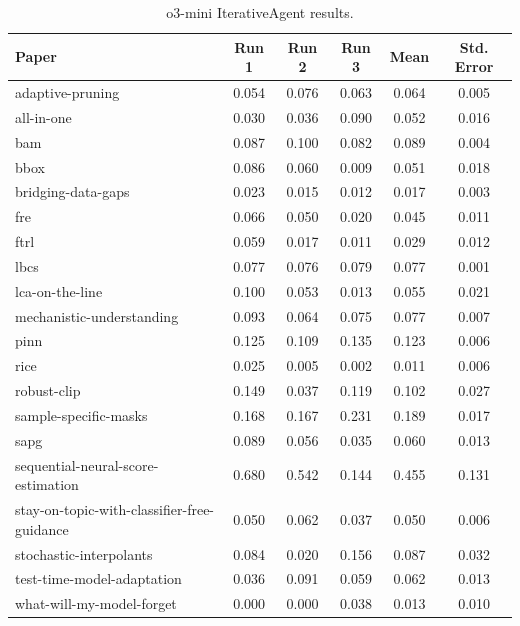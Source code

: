 \documentclass{article}
\theoremstyle{plain}
\theoremstyle{definition}
\theoremstyle{remark}
\begin{document}
\begin{table}[tb]
\caption{o3-mini IterativeAgent results.}
\label{tab:o3-mini-results-iterative}
\vskip 0.15in
\begin{center}
\begin{small}
\begin{sc}
\begin{tabular}{l c c c c c}
\toprule
\textbf{Paper} & \textbf{Run 1} & \textbf{Run 2} & \textbf{Run 3} & \textbf{Mean} & \textbf{Std. Error} \\
\midrule
adaptive-pruning & 0.054 & 0.076 & 0.063 & 0.064 & 0.005 \\
all-in-one & 0.030 & 0.036 & 0.090 & 0.052 & 0.016 \\
bam & 0.087 & 0.100 & 0.082 & 0.089 & 0.004 \\
bbox & 0.086 & 0.060 & 0.009 & 0.051 & 0.018 \\
bridging-data-gaps & 0.023 & 0.015 & 0.012 & 0.017 & 0.003 \\
fre & 0.066 & 0.050 & 0.020 & 0.045 & 0.011 \\
ftrl & 0.059 & 0.017 & 0.011 & 0.029 & 0.012 \\
lbcs & 0.077 & 0.076 & 0.079 & 0.077 & 0.001 \\
lca-on-the-line & 0.100 & 0.053 & 0.013 & 0.055 & 0.021 \\
mechanistic-understanding & 0.093 & 0.064 & 0.075 & 0.077 & 0.007 \\
pinn & 0.125 & 0.109 & 0.135 & 0.123 & 0.006 \\
rice & 0.025 & 0.005 & 0.002 & 0.011 & 0.006 \\
robust-clip & 0.149 & 0.037 & 0.119 & 0.102 & 0.027 \\
sample-specific-masks & 0.168 & 0.167 & 0.231 & 0.189 & 0.017 \\
sapg & 0.089 & 0.056 & 0.035 & 0.060 & 0.013 \\
sequential-neural-score-estimation & 0.680 & 0.542 & 0.144 & 0.455 & 0.131 \\
stay-on-topic-with-classifier-free-guidance & 0.050 & 0.062 & 0.037 & 0.050 & 0.006 \\
stochastic-interpolants & 0.084 & 0.020 & 0.156 & 0.087 & 0.032 \\
test-time-model-adaptation & 0.036 & 0.091 & 0.059 & 0.062 & 0.013 \\
what-will-my-model-forget & 0.000 & 0.000 & 0.038 & 0.013 & 0.010 \\
\bottomrule
\end{tabular}
\end{sc}
\end{small}
\end{center}
\vskip -0.1in
\end{table}
\end{document}
